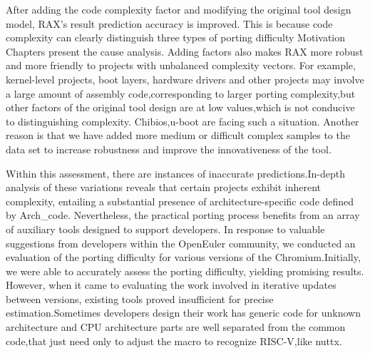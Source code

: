 \documentclass[sigconf,screen,review,anonymous]{acmart}
\begin{document}
After adding the code complexity factor and modifying the original tool design model, RAX's result prediction accuracy is improved.
This is because code complexity can clearly distinguish three types of porting difficulty
Motivation Chapters present the cause analysis.
Adding factors also makes RAX more robust and more friendly to projects with unbalanced complexity vectors.
For example, kernel-level projects, boot layers, hardware drivers and other projects may involve a large amount of assembly code,corresponding to larger porting complexity,but other factors of the original tool design are at low values,which is not conducive to distinguishing complexity.
Chibios,u-boot are facing such a situation. Another reason is that we have added more medium or difficult complex samples to the data set to increase robustness and improve the innovativeness of the tool.     




Within this assessment, there are instances of inaccurate predictions.In-depth analysis of these variations reveals that certain projects exhibit inherent complexity, entailing a substantial presence of architecture-specific code defined by Arch\_code.
Nevertheless, the practical porting process benefits from an array of auxiliary tools designed to support developers. In response to valuable suggestions from developers within the OpenEuler community, we conducted an evaluation of the porting difficulty for various versions of the Chromium.Initially, we were able to accurately assess the porting difficulty, yielding promising results. However, when it came to evaluating the work involved in iterative updates between versions, existing tools proved insufficient for precise estimation.Sometimes developers design their work has generic code for unknown architecture and CPU architecture parts are well separated from the common code,that just need only to adjust the macro to recognize RISC-V,like nuttx.
\end{document}
